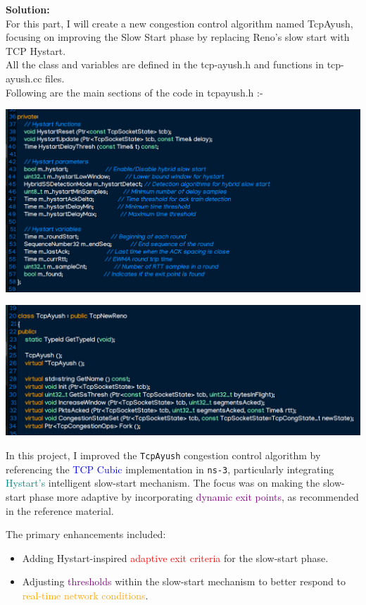 \documentclass[11pt,a4paper]{article}
\begin{document}
\large{\textbf{Solution:}}\\
For this part, I will create a new congestion control algorithm named TcpAyush, focusing on improving the Slow Start phase by replacing Reno's slow start with TCP Hystart.\\
All the class and variables are defined in the tcp-ayush.h and functions in tcp-ayush.cc files.\\
Following are the main sections of the code in tcpayush.h :-
\begin{center}
    \includegraphics[width=1\columnwidth]{images/tcpayush.h.jpg}
\end{center}
\begin{center}
    \includegraphics[width=1\columnwidth]{images/tcpayush-functions.jpg}
\end{center}
In this project, I improved the \texttt{TcpAyush} congestion control algorithm by referencing the \textcolor{blue}{TCP Cubic} implementation in \texttt{ns-3}, particularly integrating \textcolor{teal}{Hystart's} intelligent slow-start mechanism. The focus was on making the slow-start phase more adaptive by incorporating \textcolor{purple}{dynamic exit points}, as recommended in the reference material.

The primary enhancements included:
\begin{itemize}
    \item Adding Hystart-inspired \textcolor{red}{adaptive exit criteria} for the slow-start phase.
    \item Adjusting \textcolor{purple}{thresholds} within the slow-start mechanism to better respond to \textcolor{orange}{real-time network conditions}.
\end{itemize}
\end{document}
